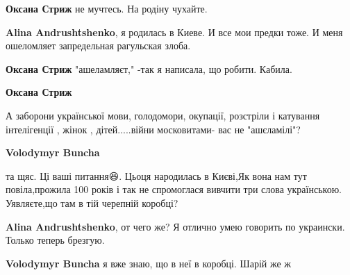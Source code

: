 \begin{itemize}
\begin{itemize}
\textbf{Оксана Стриж} не мучтесь. На родіну чухайте.

 
\textbf{Alina Andrushtshenko}, я родилась в Киеве. И все мои предки тоже. И меня ошеломляет запредельная рагульская злоба.

 
\textbf{Оксана Стриж} "ашеламляєт," -так я написала, що робити. Кабила.

 
\textbf{Оксана Стриж} 

А заборони української мови, голодомори, окупації, розстріли і катування
інтелігенції , жінок , дітей.....війни московитами- вас не "ашєламілі"?

 
\textbf{Volodymyr Buncha} 

та щяс. Ці ваші питання😆. Цьоця народилась в Києві,Як вона нам тут
повіла,прожила 100 років і так не спромоглася вивчити три слова українською.
Уявляєте,що там в тій черепній коробці?


 
\textbf{Alina Andrushtshenko}, от чего же? Я отлично умею говорить по украински. Только теперь брезгую.

 
\textbf{Volodymyr Buncha} я вже знаю, що в неї в коробці. Шарій же ж

 

\end{itemize}
\end{itemize}
